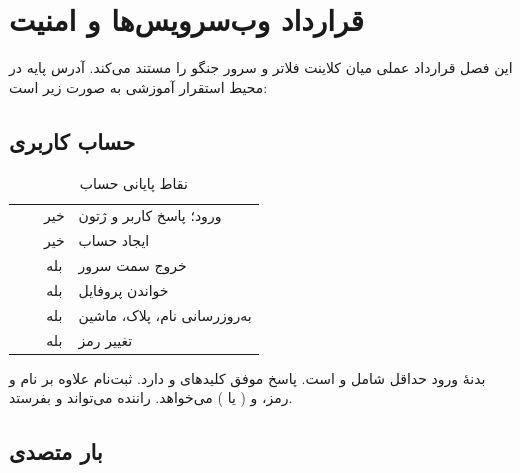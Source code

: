 \chapter[وب‌سرویس‌ها و امنیت]{قرارداد وب‌سرویس‌ها و امنیت}

این فصل قرارداد عملی میان کلاینت فلاتر و سرور جنگو را مستند می‌کند. آدرس پایه در محیط استقرار آموزشی به صورت زیر است:

\section{حساب کاربری}

\begin{table}[ht]
\centering
\caption{نقاط پایانی حساب}
\label{tab:api-accounts}
\begin{tabularx}{\textwidth}{@{}c >{\raggedleft\arraybackslash}p{} c Y@{}}
\toprule
{} &  &  &  \\
\midrule
{} &  & خیر & ورود؛ پاسخ کاربر و ژتون \\
 &  & خیر & ایجاد حساب \\
 &  & بله & خروج سمت سرور \\
 &  & بله & خواندن پروفایل \\
 &  & بله & به‌روزرسانی نام، پلاک، ماشین \\
 &  & بله & تغییر رمز \\
\bottomrule
\end{tabularx}
\end{table}

بدنهٔ ورود حداقل شامل  و  است. پاسخ موفق کلیدهای  و  دارد. ثبت‌نام علاوه بر نام و رمز،  و  ( یا ) می‌خواهد. راننده می‌تواند  و  بفرستد.

\section{بار متصدی}

